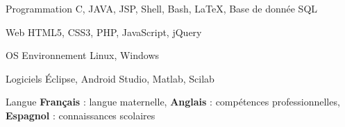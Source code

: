 

\begin{cvskills}

	\cvskill
		{Programmation} %
		{C, JAVA, JSP, Shell, Bash, \LaTeX, Base de donnée SQL} %

	\cvskill
		{Web} %
		{HTML5, CSS3, PHP, JavaScript, jQuery } %

	\cvskill
		{OS} %
		{Environnement Linux, Windows} %

	\cvskill
	    {Logiciels} %
	    {Éclipse, Android Studio, Matlab, Scilab} %

  \cvskill
    {Langue} %
    {\textbf{Français} : langue maternelle, \textbf{Anglais}  : compétences professionnelles, \textbf{Espagnol} : connaissances scolaires} %

\end{cvskills}
